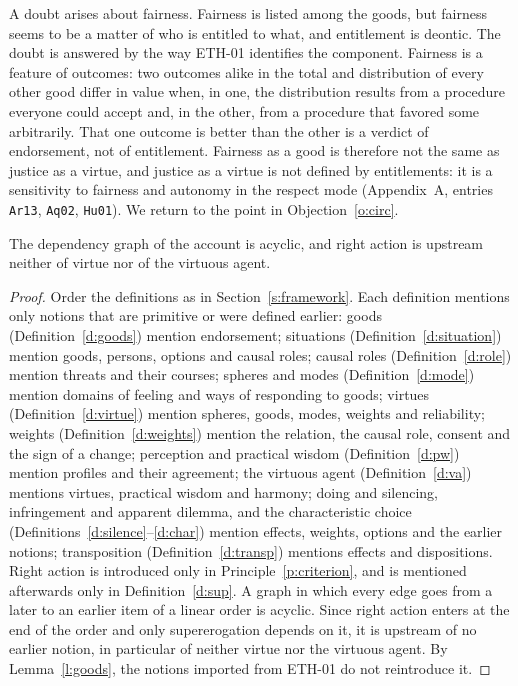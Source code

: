 \documentclass{situationist-preprint}
\begin{document}
A doubt arises about fairness. Fairness is listed among the goods, but fairness seems to be a matter of who is entitled to what, and entitlement is deontic. The doubt is answered by the way ETH-01 identifies the component. Fairness is a feature of outcomes: two outcomes alike in the total and distribution of every other good differ in value when, in one, the distribution results from a procedure everyone could accept and, in the other, from a procedure that favored some arbitrarily. That one outcome is better than the other is a verdict of endorsement, not of entitlement. Fairness as a good is therefore not the same as justice as a virtue, and justice as a virtue is not defined by entitlements: it is a sensitivity to fairness and autonomy in the respect mode (Appendix~A, entries \texttt{Ar13}, \texttt{Aq02}, \texttt{Hu01}). We return to the point in Objection~\ref{o:circ}.

\begin{theorem}[Independence]\label{t:indep}
The dependency graph of the account is acyclic, and right action is upstream neither of virtue nor of the virtuous agent.
\end{theorem}

\begin{proof}
Order the definitions as in Section~\ref{s:framework}. Each definition mentions only notions that are primitive or were defined earlier: goods (Definition~\ref{d:goods}) mention endorsement; situations (Definition~\ref{d:situation}) mention goods, persons, options and causal roles; causal roles (Definition~\ref{d:role}) mention threats and their courses; spheres and modes (Definition~\ref{d:mode}) mention domains of feeling and ways of responding to goods; virtues (Definition~\ref{d:virtue}) mention spheres, goods, modes, weights and reliability; weights (Definition~\ref{d:weights}) mention the relation, the causal role, consent and the sign of a change; perception and practical wisdom (Definition~\ref{d:pw}) mention profiles and their agreement; the virtuous agent (Definition~\ref{d:va}) mentions virtues, practical wisdom and harmony; doing and silencing, infringement and apparent dilemma, and the characteristic choice (Definitions~\ref{d:silence}--\ref{d:char}) mention effects, weights, options and the earlier notions; transposition (Definition~\ref{d:transp}) mentions effects and dispositions. Right action is introduced only in Principle~\ref{p:criterion}, and is mentioned afterwards only in Definition~\ref{d:sup}. A graph in which every edge goes from a later to an earlier item of a linear order is acyclic. Since right action enters at the end of the order and only supererogation depends on it, it is upstream of no earlier notion, in particular of neither virtue nor the virtuous agent. By Lemma~\ref{l:goods}, the notions imported from ETH-01 do not reintroduce it.
\end{proof}
\end{document}
